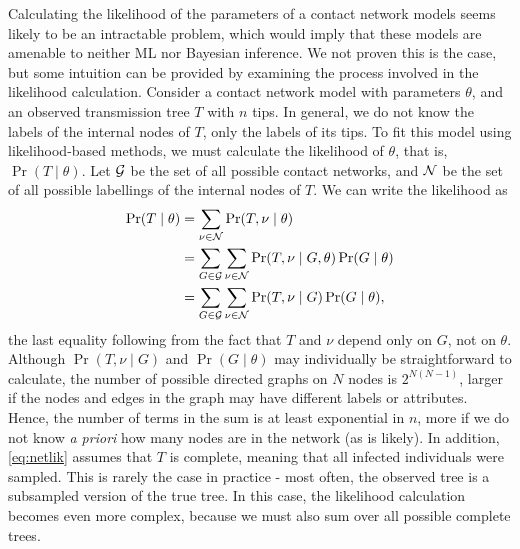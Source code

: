Calculating the likelihood of the parameters of a contact network models seems
likely to be an intractable problem, which would imply that these models are
amenable to neither \gls{ML} nor Bayesian inference. We not proven this is the
case, but some intuition can be provided by examining the process involved in
the likelihood calculation. Consider a contact network model with parameters
$\theta$, and an observed transmission tree $T$ with $n$ tips.  In general, we
do not know the labels of the internal nodes of $T$, only the labels of its
tips. To fit this model using likelihood-based methods, we must calculate the
likelihood of $\theta$, that is, $\Pr(T \mid \theta)$. Let $\mathcal{G}$ be the set of
all possible contact networks, and $\mathcal{N}$ be the set of all possible labellings
of the internal nodes of $T$. We can write the likelihood as
\begin{align}
\begin{split}
  \label{eq:netlik}
  \Pr(T \mid \theta)
    &= \sum_{\nu \in \mathcal{N}} \Pr(T, \nu \mid \theta) \\
    &= \sum_{G \in \mathcal{G}} \sum_{\nu \in \mathcal{N}} \Pr(T, \nu \mid G, \theta) \Pr(G \mid \theta) \\
    &= \sum_{G \in \mathcal{G}} \sum_{\nu \in \mathcal{N}} \Pr(T, \nu \mid G) \Pr(G \mid \theta),
\end{split}
\end{align}
the last equality following from the fact that $T$ and $\nu$ depend only on
$G$, not on $\theta$. Although $\Pr(T, \nu \mid G)$ and $\Pr(G \mid \theta)$
may individually be straightforward to calculate, the number of possible
directed graphs on $N$ nodes is $2^{N(N-1)}$, larger if the nodes and edges in
the graph may have different labels or attributes. Hence, the number of terms
in the sum is at least exponential in $n$, more if we do not know \textit{a
priori} how many nodes are in the network (as is likely). In addition,
\cref{eq:netlik} assumes that $T$ is complete, meaning that all infected
individuals were sampled. This is rarely the case in practice - most often, the
observed tree is a subsampled version of the true tree. In this case, the
likelihood calculation becomes even more complex, because we must also sum over
all possible complete trees.

